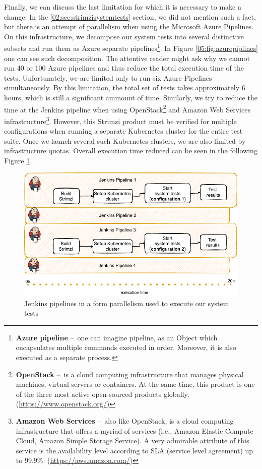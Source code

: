 Finally, we can discuss the last limitation for which it is necessary to make a change.
In the \ref{02:sec:strimzisystemtests} section, we did not mention such a fact, but there is an attempt of parallelism when using the Microsoft Azure Pipelines.
On this infrastructure, we decompose our system tests into several distinctive subsets and run them as Azure separate pipelines\footnote{\textbf{Azure pipeline} \---\ one can imagine pipeline, as an Object which encapsulates multiple commands executed in order. Moreover, it is also executed as a separate process.}.
In Figure \ref{05:fig:azurepiplines} one can see such decomposition.
The attentive reader might ask why we cannot run 40 or 100 Azure pipelines and thus reduce the total execution time of the tests.
Unfortunately, we are limited only to run six Azure Pipelines simultaneously.
By this limitation, the total set of tests takes approximately 6 hours, which is still a significant ammount of time.
Similarly, we try to reduce the time at the Jenkins pipeline when using OpenStack\footnote{\textbf{OpenStack} \---\ is a cloud computing infrastructure that manages physical machines, virtual servers or containers. At the same time, this product is one of the three most active open-sourced products globally. (\url{https://www.openstack.org/})} and Amazon Web Services infrastructure\footnote{\textbf{Amazon Web Services} \---\ also like OpenStack, is a cloud computing infrastructure that offers a myriad of services (i.e., Amazon Elastic Compute Cloud, Amazon Simple Storage Service). A very admirable attribute of this service is the availability level according to SLA (service level agreement) up to 99.9\%. (\url{https://aws.amazon.com/})}.
However, this Strimzi product must be verified for multiple configurations when running a separate Kubernetes cluster for the entire test suite.
Once we launch several such Kubernetes clusters, we are also limited by infrastructure quotas.
Overall execution time reduced can be seen in the following Figure \ref{05:fig:jenkinspipelines}.
\begin{figure}[!ht]
    \centering
    \includegraphics[scale=1]{obrazky-figures/06-proposal-of-parallel-approach/02-jenkins-smaller.pdf}
    \caption{Jenkins pipelines in a form parallelism used to execute our system tests}
    \label{05:fig:jenkinspipelines}
\end{figure}

